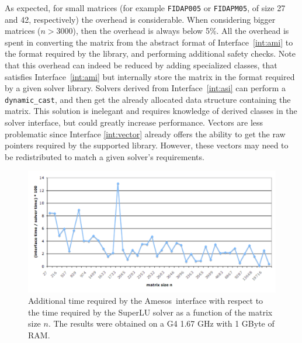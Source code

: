 \documentclass[acmtoms,acmnow]{acmtrans2m}
\newcommand{\amesos}{{\sc Amesos}}
\begin{document}
As expected, for small matrices (for example \verb!FIDAP005! or \verb!FIDAPM05!, of size
27 and 42, respectively)
the overhead is considerable. When considering bigger matrices ($n > 3000$),
then the overhead is  always below 5\%. All the overhead is spent in
converting the matrix from the abstract format of Interface~\ref{int:ami} to the
format required by the library, and performing additional safety checks.
Note that this overhead can indeed be reduced by adding specialized classes,
     that satisfies Interface~\ref{int:ami} but internally store the matrix
     in the format required by a given solver library. Solvers derived from
     Interface~\ref{int:asi} can perform a {\tt dynamic\_cast}, and then get
     the already allocated data structure containing the matrix. This solution
     is inelegant and requires knowledge of derived classes in the solver
     interface, but could greatly increase performance.  Vectors are less
     problematic since Interface \ref{int:vector} already offers the ability
     to get the raw pointers required by the supported library. However, these
     vectors may need to be redistributed to match a given solver's
     requirements.

\begin{figure}
\begin{center}
\includegraphics[width=12cm]{superlu_time.pdf}
\caption{Additional time required by the \amesos\ interface with respect to the
time required by the SuperLU solver as a
  function of the matrix size $n$.
The results were obtained on a G4 1.67 GHz with 1 GByte of RAM.}
\label{fig:results1}
\end{center}
\end{figure}
\end{document}
